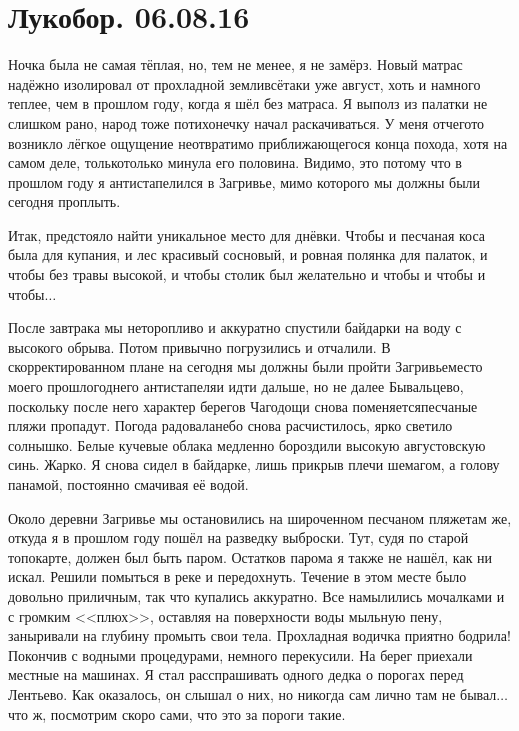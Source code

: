 \chapter{Лукобор. 06.08.16} 

Ночка была не самая тёплая, но, тем не менее, я не замёрз. Новый матрас надёжно изолировал от прохладной земли\mdash всё\sdash таки уже август, хоть и намного теплее, чем в прошлом году, когда я шёл без матраса. Я выполз из палатки не слишком рано, народ тоже потихонечку начал раскачиваться. У меня отчего\sdash то возникло лёгкое ощущение неотвратимо приближающегося конца похода, хотя на самом деле, только\sdash только минула его половина. Видимо, это потому что в прошлом году я антистапелился в Загривье, мимо которого мы должны были сегодня проплыть. 
 
Итак, предстояло найти уникальное место для днёвки. Чтобы и песчаная коса была для купания, и лес красивый сосновый, и ровная полянка для палаток, и чтобы без травы высокой, и чтобы столик был желательно и чтобы и чтобы и чтобы$\ldots$  

После завтрака мы неторопливо и аккуратно спустили байдарки на воду с высокого обрыва. Потом привычно погрузились и отчалили. В скорректированном плане на сегодня мы должны были пройти Загривье\mdash место моего прошлогоднего антистапеля\mdash и идти дальше, но не далее Бывальцево, поскольку после него характер берегов Чагодощи снова поменяется\mdash песчаные пляжи пропадут. Погода радовала\mdash небо снова расчистилось, ярко светило солнышко. Белые кучевые облака медленно бороздили высокую августовскую синь. Жарко. Я снова сидел в байдарке, лишь прикрыв плечи шемагом, а голову панамой, постоянно смачивая её водой. 

Около деревни Загривье мы остановились на широченном песчаном пляже\mdash там же, откуда я в прошлом году пошёл на разведку выброски. Тут, судя по старой топокарте, должен был быть паром. Остатков парома я также не нашёл, как ни искал. Решили помыться в реке и передохнуть. Течение в этом месте было довольно приличным, так что купались аккуратно. Все намылились мочалками и с громким <<плюх>>, оставляя на поверхности воды мыльную пену, заныривали на глубину промыть свои тела. Прохладная водичка приятно бодрила! Покончив с водными процедурами, немного перекусили. На берег приехали местные на машинах. Я стал расспрашивать одного дедка о порогах перед Лентьево. Как оказалось, он слышал о них, но никогда сам лично там не бывал$\ldots$ что ж, посмотрим скоро сами, что это за пороги такие. 

